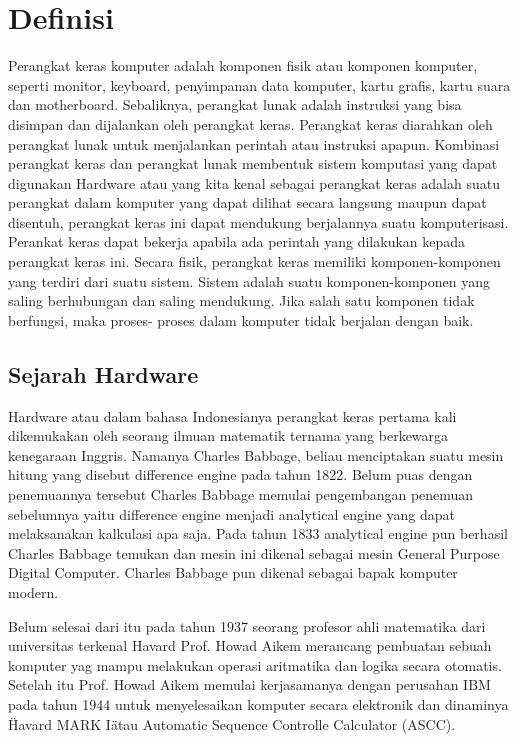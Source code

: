 
\section{Definisi}
Perangkat keras komputer adalah komponen fisik atau komponen komputer, seperti monitor, keyboard, penyimpanan data komputer, kartu grafis, kartu suara dan motherboard. \cite{clements2006principles} Sebaliknya, perangkat lunak adalah instruksi yang bisa disimpan dan dijalankan oleh perangkat keras.
Perangkat keras diarahkan oleh perangkat lunak untuk menjalankan perintah atau instruksi apapun. Kombinasi perangkat keras dan perangkat lunak membentuk sistem komputasi yang dapat digunakan
Hardware atau yang kita kenal sebagai perangkat keras adalah suatu perangkat dalam komputer yang dapat dilihat secara langsung maupun dapat
disentuh, perangkat keras ini dapat mendukung berjalannya suatu komputerisasi. Perankat keras dapat bekerja apabila ada perintah yang
dilakukan kepada perangkat keras ini. Secara fisik, perangkat keras memiliki komponen-komponen yang terdiri dari suatu sistem. Sistem
adalah suatu komponen-komponen yang saling berhubungan dan saling mendukung. Jika salah satu komponen tidak berfungsi, maka proses-
proses dalam komputer tidak berjalan dengan baik.

\subsection{Sejarah Hardware}
Hardware atau dalam bahasa Indonesianya perangkat keras pertama kali dikemukakan oleh seorang ilmuan matematik ternama yang berkewarga
kenegaraan Inggris. Namanya Charles Babbage, beliau menciptakan suatu mesin hitung yang disebut difference engine pada tahun 1822.
Belum puas dengan penemuannya tersebut Charles Babbage memulai pengembangan penemuan sebelumnya yaitu difference engine menjadi
analytical engine yang dapat melaksanakan kalkulasi apa saja. Pada tahun 1833 analytical engine pun berhasil Charles Babbage temukan
dan mesin ini dikenal sebagai mesin General Purpose Digital Computer. Charles Babbage pun dikenal sebagai bapak komputer modern.

Belum selesai dari itu pada tahun 1937 seorang profesor ahli matematika dari universitas terkenal Havard Prof. Howad Aikem merancang
pembuatan sebuah komputer yag mampu melakukan operasi aritmatika dan logika secara otomatis. Setelah itu Prof. Howad Aikem memulai
kerjasamanya dengan perusahan IBM pada tahun 1944 untuk menyelesaikan komputer secara elektronik dan dinaminya \"Havard MARK I\" atau
Automatic Sequence Controlle Calculator (ASCC).

